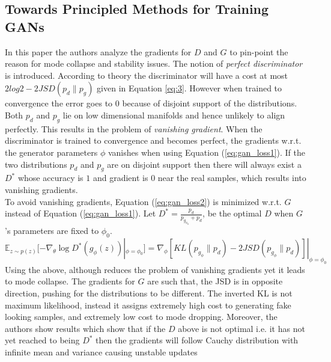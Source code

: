 \subsection*{Towards Principled Methods for Training GANs \citep{arjovsky01}}
In this paper the authors analyze the gradients for $D$ and $G$ to pin-point the reason for mode collapse and stability issues. The notion of \emph{perfect discriminator} is introduced. According to theory the discriminator will have a cost at most $2log2 - 2JSD(p_d \parallel p_g)$ given in Equation \ref{eq:3}. However when trained to convergence the error goes to 0 because of disjoint support of the distributions. Both $p_d$ and $p_g$ lie on low dimensional manifolds and hence unlikely to align perfectly. This results in the problem of  \emph{vanishing gradient}. When the discriminator is trained to convergence and becomes perfect, the gradients w.r.t. the generator parameters $\phi$ vanishes when using Equation (\ref{eq:gan_loss1}). If the two distributions $p_d$ and $p_g$ are on disjoint support then there will always exist a $D^*$ whose accuracy is $1$ and gradient is $0$ near the real samples, which results into vanishing gradients. \\
 To avoid vanishing gradients, Equation (\ref{eq:gan_loss2}) is minimized w.r.t. $G$ instead of Equation (\ref{eq:gan_loss1}). Let $D^* = \frac{p_{d}}{p_{g_{\phi_{0}}} + p_{d}}$, be the optimal $D$ when $G$'s parameters are fixed to $\phi_0$.
\begin{dmath*}
\mathbb{E}_{z\sim p(z)}[-\nabla_{\theta} \log D^*(g_{\phi}(z))|_{\phi = \phi_{0}} ] = \nabla_{\phi}[KL(p_{g_{\phi}}\parallel p_{d}) - 2 JSD(p_{g_{\phi}}\parallel p_{d})] |_{\phi = \phi_{0}}
\end{dmath*} 
Using the above, although reduces the problem of vanishing gradients yet it leads to mode collapse. The gradients for $G$ are such that, the JSD is in opposite direction, pushing for the distributions to be different. The inverted KL is not maximum likelihood, instead it assigns extremely high cost to generating fake looking samples, and extremely low cost to mode dropping. Moreover, the authors show results which show that if the $D$ above is not optimal i.e. it has not yet reached to being $D^*$ then the gradients will follow Cauchy distribution with infinite mean and variance causing unstable updates

